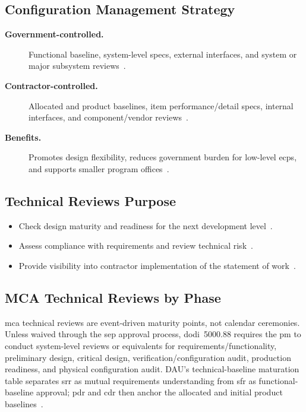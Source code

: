 \documentclass[../main.tex]{subfiles}
\begin{document}
\subsection{Configuration Management Strategy}
\begin{description}
  \item[\textbf{Government-controlled.}] Functional baseline, system-level specs, external interfaces, and system or major subsystem reviews~\autocite{edo-3-5-3-cm-tech-reviews-2025}.
  \item[\textbf{Contractor-controlled.}] Allocated and product baselines, item performance/detail specs, internal interfaces, and component/vendor reviews~\autocite{edo-3-5-3-cm-tech-reviews-2025}.
  \item[\textbf{Benefits.}] Promotes design flexibility, reduces government burden for low-level \acp{ecp}, and supports smaller program offices~\autocite{edo-3-5-3-cm-tech-reviews-2025}.
\end{description}

\subsection{Technical Reviews Purpose}
\begin{itemize}
  \item Check design maturity and readiness for the next development level~\autocite{edo-3-5-3-cm-tech-reviews-2025}.
  \item Assess compliance with requirements and review technical risk~\autocite{edo-3-5-3-cm-tech-reviews-2025}.
  \item Provide visibility into contractor implementation of the statement of work~\autocite{edo-3-5-3-cm-tech-reviews-2025}.
\end{itemize}

\subsection{MCA Technical Reviews by Phase}
\ac{mca} technical reviews are event-driven maturity points, not calendar ceremonies. Unless waived through the \ac{sep} approval process, \ac{dodi}~5000.88 requires the \ac{pm} to conduct system-level reviews or equivalents for requirements/functionality, preliminary design, critical design, verification/configuration audit, production readiness, and physical configuration audit. DAU's technical-baseline maturation table separates \ac{srr} as mutual requirements understanding from \ac{sfr} as functional-baseline approval; \ac{pdr} and \ac{cdr} then anchor the allocated and initial product baselines~\autocite{DoDI5000-88,DoD-EngineeringDefenseSystemsGuidebook-2024,DAU-Technical-Baselines,DAU-System-Requirements-Review,DAU-System-Functional-Review,DAU-Preliminary-Design-Review,DAU-Critical-Design-Review}.
\end{document}
